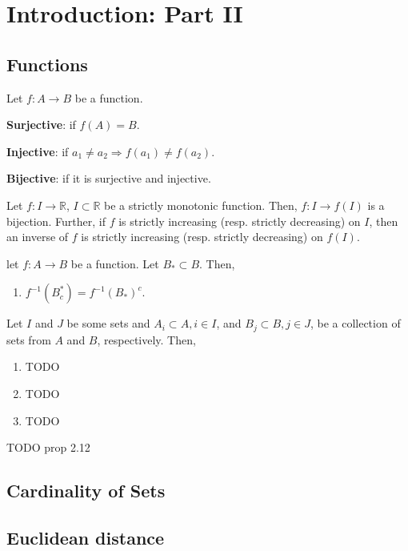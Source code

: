 \chapter{Introduction: Part II}%
\label{cha:Introduction: Part II}

\section{Functions}%
\label{sec:Functions}

\begin{definition}[]
    \label{def:2.3}
    Let $f: A \to B $ be a function.

    \textbf{Surjective}: if $f(A) = B$.

    \textbf{Injective}: if $a_1 \neq a_2 \Rightarrow f(a_1) \neq f(a_2)$.

    \textbf{Bijective}: if it is surjective and injective.
\end{definition}

\begin{proposition}[]
    \label{prop:2.2}
    Let $f: I\to \mathbb{R} $, $I \subset \mathbb{R} $ be a strictly monotonic function.
    Then, $f: I \to f(I) $ is a bijection. Further, if $f $ is strictly increasing (resp.
    strictly decreasing) on $I $, then an inverse of $f $ is strictly increasing (resp.
    strictly decreasing) on $f(I) $.
\end{proposition}

\begin{proposition}[]
\label{prop:2.4}
let $f: A \to B$ be a function. Let $B_* \subset B$. Then,
\begin{enumerate}[label=(\alph*)]
    \item $f^{-1}(B_{c}^{*}) = f^{-1}(B_*)^{c}.$
\end{enumerate}
Let $I$ and $J$ be some sets and $A_i \subset A, i \in  I$, and $B_j \subset B, j \in  J$, be a
collection of sets from $A$ and $B$, respectively. Then,
\begin{enumerate}[resume*]
    \item TODO
    \item TODO
    \item TODO
\end{enumerate}
\end{proposition}

\begin{proposition}[]
    \label{prop:2.12}
    TODO prop 2.12
\end{proposition}

\section{Cardinality of Sets}%
\label{sec:Cardinality of Sets}

\section{Euclidean distance}%
\label{sec:Euclidean distance}


